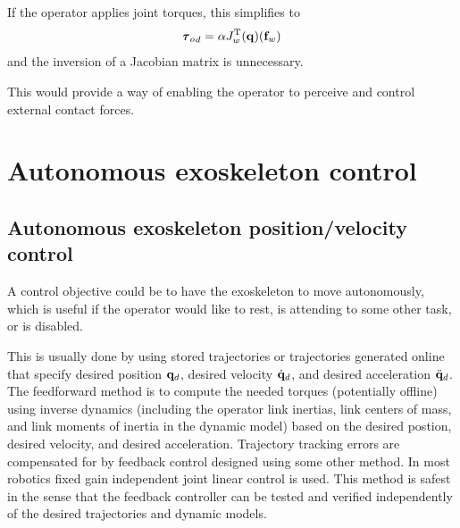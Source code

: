 \documentclass[letterpaper,12pt,fullpage]{article}
\begin{document}
If the operator applies joint torques, this simplifies to
\begin{equation}
{\vtau_o}_d = \alpha J_w^{\tr}(\vq) ( \vf_w )
\end{equation}
and the inversion of a Jacobian matrix is unnecessary.

This would provide a way of enabling the operator to perceive and control
external contact forces.

\section{Autonomous exoskeleton control}

\subsection{Autonomous exoskeleton position/velocity control}

A control objective could be to have the exoskeleton to move autonomously,
which is useful if the operator would like to rest, is attending to some other
task, or is disabled.

This is usually done by using stored trajectories or trajectories generated
online that specify desired position ${\bf q}_d$, 
desired velocity $\dot{{\bf q}}_d$, and
desired acceleration $\ddot{{\bf q}}_d$.
The feedforward method is to compute the needed torques (potentially offline)
using inverse
dynamics (including the operator link inertias, link centers of mass, and link
moments of inertia in the dynamic model) based on the desired postion, 
desired velocity, and desired acceleration. Trajectory tracking errors are compensated
for by feedback control designed using some other method. In most robotics
fixed gain independent joint linear control is used.
This method is safest in the sense that the feedback controller can be tested
and verified independently of the desired trajectories and dynamic models.
\end{document}
